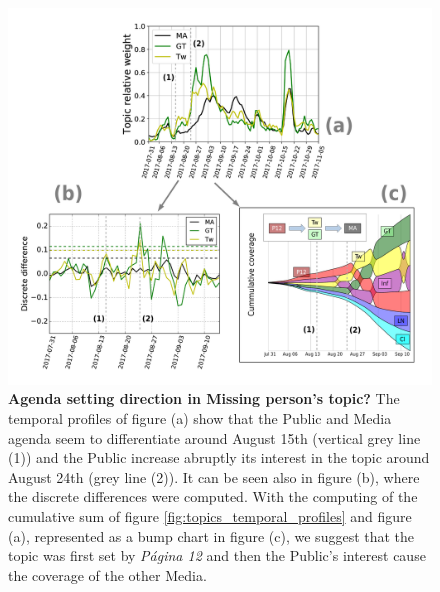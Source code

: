 \documentclass{bmcart}
\begin{document}
\begin{backmatter}
\begin{figure}[h!]
\includegraphics[width = \textwidth]{Fig8.pdf}
\caption{\textbf{Agenda setting direction in Missing person's topic?}
The temporal profiles of figure (a) show that the Public and Media agenda seem to differentiate around August 15th (vertical grey line (1)) and the Public increase abruptly its interest in the topic around August 24th (grey line (2)). It can be seen also in figure (b), where the discrete differences were computed. 
With the computing of the cumulative sum of figure \ref{fig:topics_temporal_profiles} and figure (a), represented as a bump chart in figure (c), we suggest that the topic was first set by \emph{P\'agina 12} and then the Public's interest cause the coverage of the other Media.
}
\label{fig:Maldonado_setagenda}
\end{figure}


\end{backmatter}
\end{document}

